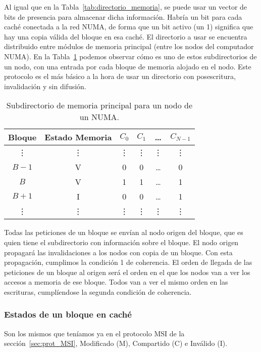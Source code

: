 Al igual que en la Tabla~\ref{tab:directorio_memoria}, se puede usar un vector de bits de presencia para almacenar dicha información. Habría un bit para cada caché conectada a la red NUMA, de forma que un bit activo (un 1) significa que hay una copia válida del bloque en esa caché. El directorio a usar se encuentra distribuido entre módulos de memoria principal (entre los nodos del computador NUMA). En la Tabla~\ref{tab:subdirectorio_memoria} podemos observar cómo es uno de estos subdirectorios de un nodo, con una entrada por cada bloque de memoria alojado en el nodo. Este protocolo es el más básico a la hora de usar un directorio con posescritura, invalidación y sin difusión.

\begin{table}
\centering
\begin{tabular}{c c c c c c}
    \toprule
    Bloque & Estado Memoria & $C_0$ & $C_1$ & \ldots & $C_{N-1}$ \\
    \bottomrule
    \vdots & \vdots & \vdots & \vdots & \vdots & \vdots \\
    $B-1$ & V & 0 & 0 & \ldots & 0 \\
    $B$ & V & 1 & 1 & \ldots & 1 \\
    $B+1$ & I & 0 & 0 & \ldots & 1 \\
    \vdots & \vdots & \vdots & \vdots & \vdots & \vdots \\
    \bottomrule
\end{tabular}
\caption{Subdirectorio de memoria principal para un nodo de un NUMA.}
\label{tab:subdirectorio_memoria}
\end{table}

Todas las peticiones de un bloque se envían al nodo origen del bloque, que es quien tiene el subdirectorio con información sobre el bloque. El nodo origen propagará las invalidaciones a los nodos con copia de un bloque. Con esta propagación, cumplimos la condición 1 de coherencia. El orden de llegada de las peticiones de un bloque al origen será el orden en el que los nodos van a ver los accesos a memoria de ese bloque. Todos van a ver el mismo orden en las escrituras, cumplíendose la segunda condición de coherencia.

\subsubsection{Estados de un bloque en caché}
Son los mismos que teníamos ya en el protocolo MSI de la sección~\ref{sec:prot_MSI}, Modificado (M), Compartido (C) e Inválido (I).

